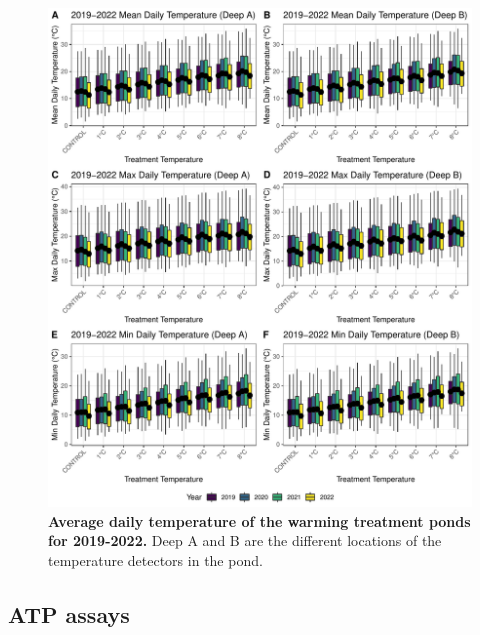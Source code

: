 \begin{figure}[H]
    \centering
    \includegraphics[scale=0.78]{./Figures/Temperature/Daily_temp_AB}
    \caption{\textbf{Average daily temperature of the warming treatment ponds for 2019-2022.} Deep A and B are the different locations of the temperature detectors in the pond.}
    \label{fig:d_tempAB}
\end{figure}

\subsection{ATP assays}\label{section:ATPsup}

